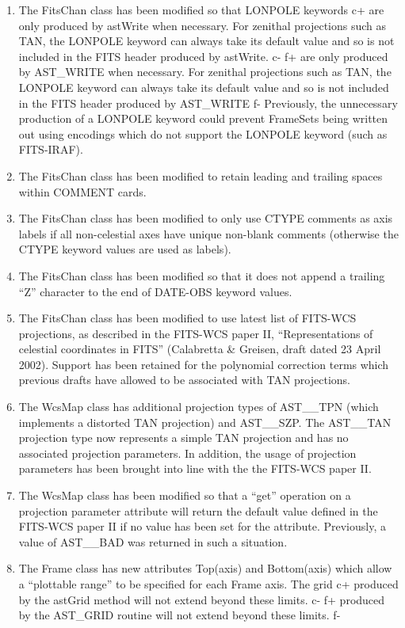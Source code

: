 \documentclass[twoside,11pt]{article}
\begin{document}
\begin{enumerate}

\item The FitsChan class has been modified so that LONPOLE keywords
c+
are only produced by astWrite when necessary. For zenithal projections such as
TAN, the LONPOLE keyword can always take its default value and so is
not included in the FITS header produced by astWrite.
c-
f+
are only produced by AST\_WRITE when necessary. For zenithal projections such as
TAN, the LONPOLE keyword can always take its default value and so is
not included in the FITS header produced by AST\_WRITE
f-
Previously, the unnecessary production of a LONPOLE keyword could prevent
FrameSets being written out using encodings which do not support the
LONPOLE keyword (such as FITS-IRAF).

\item The FitsChan class has been modified to retain leading and trailing
spaces within COMMENT cards.

\item The FitsChan class has been modified to only use CTYPE comments as
axis labels if all non-celestial axes have unique non-blank comments
(otherwise the CTYPE keyword values are used as labels).

\item The FitsChan class has been modified so that it does not append a
trailing ``Z'' character to the end of DATE-OBS keyword values.

\item The FitsChan class has been modified to use latest list of FITS-WCS
projections, as described in the FITS-WCS paper II, ``Representations of
celestial coordinates in FITS'' (Calabretta \& Greisen, draft dated 23
April 2002). Support has been retained for the polynomial correction
terms which previous drafts have allowed to be associated with TAN
projections.

\item The WcsMap class has additional projection types of AST\_\_TPN
(which implements a distorted TAN projection) and AST\_\_SZP. The AST\_\_TAN
projection type now represents a simple TAN projection and has no
associated projection parameters. In addition, the usage of projection
parameters has been brought into line with the the FITS-WCS paper II.

\item The WcsMap class has been modified so that a ``get'' operation on a
projection parameter attribute will return the default value defined in the
FITS-WCS paper II if no value has been set for the attribute. Previously, a
value of AST\_\_BAD was returned in such a situation.

\item The Frame class has new attributes Top(axis) and Bottom(axis) which
allow a ``plottable range'' to be specified for each Frame axis. The grid
c+
produced by the astGrid method will not extend beyond these limits.
c-
f+
produced by the AST\_GRID routine will not extend beyond these limits.
f-

\end{enumerate}
\end{document}
